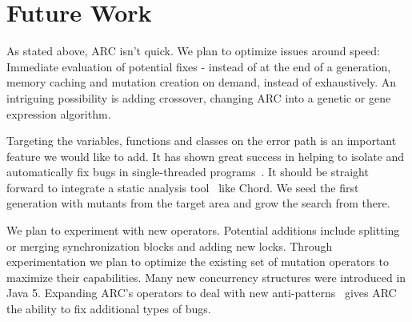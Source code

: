 \section{Future Work}
\label{sec:future_work}

As stated above, ARC isn't quick.  We plan to optimize issues around speed: Immediate evaluation of potential fixes - instead of at the end of a generation, memory caching and mutation creation on demand, instead of exhaustively.  An intriguing possibility is adding crossover, changing ARC into a genetic or gene expression algorithm.

Targeting the variables, functions and classes on the error path is an important feature 
we would like to add. It has shown great success in helping to isolate
and automatically fix bugs in single-threaded programs~\cite{FNWG09, WNLF09,
NWLF09, WFGN10, GNFW11, LDFW12}. It should be straight forward to integrate a
static analysis tool~\cite{HP04, NPSG09, NWLF09} like Chord.  We seed the first generation with mutants from the target area and grow the search from there.

We plan to experiment with new operators. Potential additions include
splitting or merging synchronization blocks and adding new locks. Through
experimentation we plan to optimize the existing set of mutation operators to
maximize their capabilities.  Many new concurrency structures were introduced in Java 5. Expanding ARC's
operators to deal with new anti-patterns~\cite{BJ09, FKLV12, BCD06} gives ARC
the ability to fix additional types of bugs.




